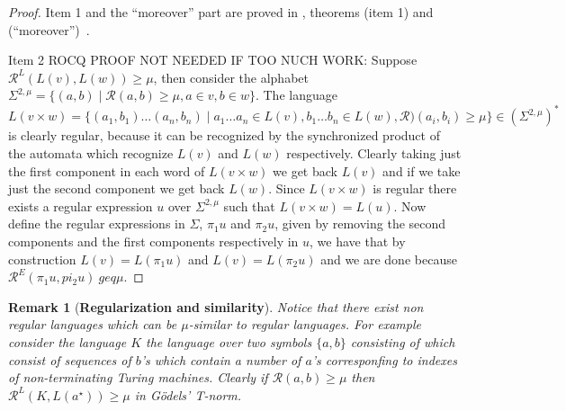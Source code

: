 \documentclass{article}
\newtheorem{remark}{Remark}[section]
\begin{document}
\begin{proof}
\begin{sloppypar}\raggedright
Item 1 and the ``moreover'' part are proved in ,
theorems  (item 1) and
 (``moreover'')~\cite{OurRocqRepo}.
\end{sloppypar}

{\color{red} Item 2 ROCQ PROOF NOT NEEDED IF TOO NUCH WORK: Suppose $\mathcal R^L(L(v),L(w))\geq \mu$, then consider the alphabet $\Sigma^{2,\mu} =\{ (a,b)\mid \mathcal R(a,b)\geq\mu, a\in v, b\in w\}$. The  language $$L(v\times w) = \{(a_1,b_1)\ldots(a_n,b_n)\mid a_1\ldots a_n\in L(v), b_1\ldots b_n\in L(w), \mathcal R)(a_i,b_i)\geq \mu\}\in (\Sigma^{2,\mu})^* $$ is clearly regular, because it can be recognized by the synchronized product of the automata which recognize $L(v)$ and $L(w)$ respectively. Clearly  taking just the first component in each word of $L(v\times w)$  we get back $L(v)$ and if we take just the second component we get back $L(w)$. Since $L(v\times w)$ is regular  there exists a regular expression $u$ over $\Sigma^{2,\mu}$ such that $L(v\times w)= L(u) $. Now  define the regular expressions in $\Sigma$, $\pi_1 u$ and $\pi_2 u$, given by removing the second components and the first components respectively in $u$, we have that by construction $L(v)=L(\pi_1 u)$ and $L(v)=L(\pi_2 u)$ and we are done because $\mathcal R^E(\pi_1 u,pi_2 u)\ geq \mu$.}

\end{proof}

{\color{red}\begin{remark}[\bf Regularization and similarity]
Notice that there exist non regular languages which can be $\mu$-similar to regular languages. For example consider the language $K$ the language over two symbols $\{a,b\}$ consisting of which consist of sequences of $b$'s which contain a number of $a$'s  corresponfing to indexes of non-terminating Turing machines. Clearly if $\mathcal R(a,b)\geq \mu$ then $\mathcal R^L(K,L(a^\star))\geq \mu$ in G\"odels' T-norm.
\end{remark}
}
\end{document}
